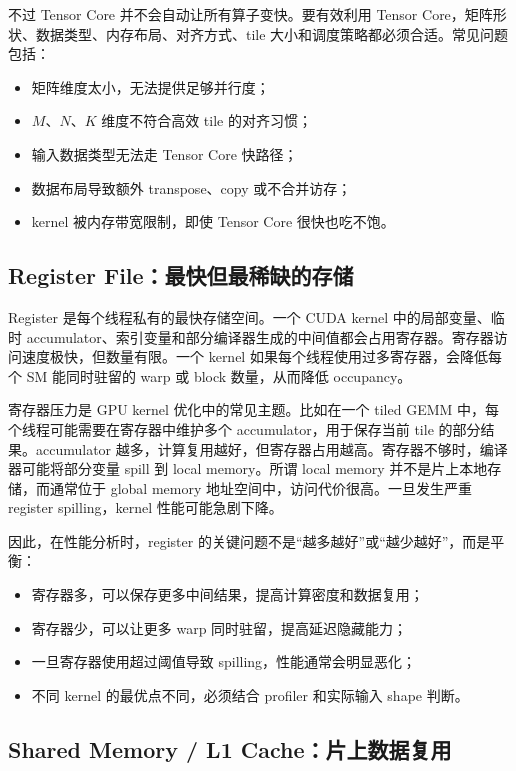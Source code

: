 不过 Tensor Core 并不会自动让所有算子变快。要有效利用 Tensor Core，矩阵形状、数据类型、内存布局、对齐方式、tile 大小和调度策略都必须合适。常见问题包括：

\begin{itemize}
  \item 矩阵维度太小，无法提供足够并行度；
  \item $M$、$N$、$K$ 维度不符合高效 tile 的对齐习惯；
  \item 输入数据类型无法走 Tensor Core 快路径；
  \item 数据布局导致额外 transpose、copy 或不合并访存；
  \item kernel 被内存带宽限制，即使 Tensor Core 很快也吃不饱。
\end{itemize}

\subsection{Register File：最快但最稀缺的存储}
\label{subsec:register-file}

Register 是每个线程私有的最快存储空间。一个 CUDA kernel 中的局部变量、临时 accumulator、索引变量和部分编译器生成的中间值都会占用寄存器。寄存器访问速度极快，但数量有限。一个 kernel 如果每个线程使用过多寄存器，会降低每个 SM 能同时驻留的 warp 或 block 数量，从而降低 occupancy。

寄存器压力是 GPU kernel 优化中的常见主题。比如在一个 tiled GEMM 中，每个线程可能需要在寄存器中维护多个 accumulator，用于保存当前 tile 的部分结果。accumulator 越多，计算复用越好，但寄存器占用越高。寄存器不够时，编译器可能将部分变量 spill 到 local memory。所谓 local memory 并不是片上本地存储，而通常位于 global memory 地址空间中，访问代价很高。一旦发生严重 register spilling，kernel 性能可能急剧下降。

因此，在性能分析时，register 的关键问题不是“越多越好”或“越少越好”，而是平衡：

\begin{itemize}
  \item 寄存器多，可以保存更多中间结果，提高计算密度和数据复用；
  \item 寄存器少，可以让更多 warp 同时驻留，提高延迟隐藏能力；
  \item 一旦寄存器使用超过阈值导致 spilling，性能通常会明显恶化；
  \item 不同 kernel 的最优点不同，必须结合 profiler 和实际输入 shape 判断。
\end{itemize}

\subsection{Shared Memory / L1 Cache：片上数据复用}
\label{subsec:shared-memory-l1}

